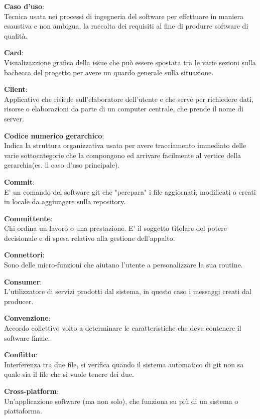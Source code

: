 \documentclass[a4paper, oneside, openany, dvipsnames, table]{article}
\begin{document}
\textbf{Caso d'uso}:\\	Tecnica usata nei processi di ingegneria del software per effettuare in maniera esaustiva e non ambigua, la raccolta dei requisiti al fine di produrre software di qualità.

\textbf{Card}:\\	Visualizazzione grafica della issue che può essere spostata tra le varie sezioni sulla bachecca del progetto per avere un quardo generale sulla situazione.

\textbf{Client}:\\	Applicativo che risiede sull'elaboratore dell'utente e che serve per richiedere dati, risorse o elaborazioni da parte di un computer centrale, che prende il nome di server.

\textbf{Codice numerico gerarchico}:\\  Indica la struttura organizzativa usata per avere tracciamento immediato delle varie sottocategorie che la compongono ed  arrivare  facilmente al vertice della gerarchia(es. il caso d'uso principale).

\textbf{Commit}:\\	E' un comando del software git che "perepara" i file aggiornati, modificati o creati in locale da aggiungere sulla repository.

\textbf{Committente}:\\	Chi ordina un lavoro o una prestazione. E' il soggetto titolare del potere decisionale e di spesa relativo alla gestione dell'appalto.

\textbf{Connettori}:\\	Sono delle micro-funzioni che aiutano l'utente a personalizzare la sua routine.

\textbf{Consumer}:\\	L'utilizzatore di servizi prodotti dal sistema, in questo caso i messaggi creati dal producer.

\textbf{Convenzione}:\\	Accordo collettivo volto a determinare le caratteristiche che deve contenere il software finale.

\textbf{Conflitto}:\\	Interferenza tra due file, si verifica quando il sistema automatico di git non sa quale sia il file che si vuole tenere dei due.

\textbf{Cross-platform}:\\	Un'applicazione software (ma non solo), che funziona su più di un sistema o piattaforma.
\end{document}
